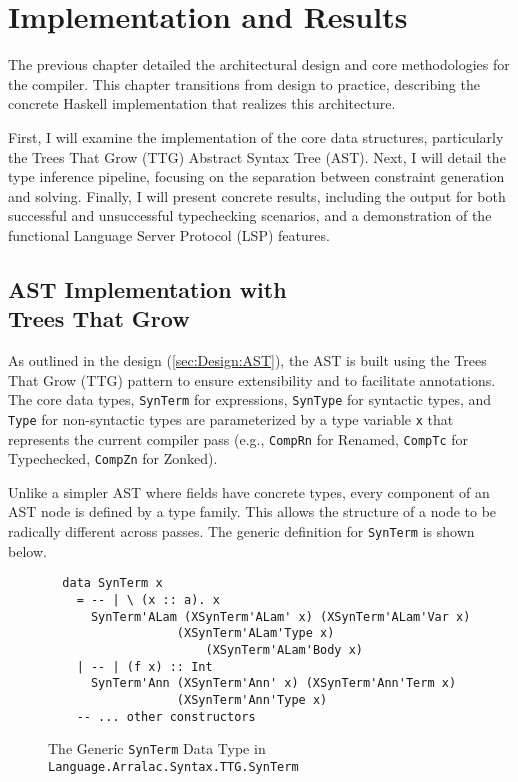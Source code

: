 \chapter{Implementation and Results}
\label{chap:ImplementationAndResults}

The previous chapter detailed the architectural design and core methodologies for the \Arralac compiler. This chapter transitions from design to practice, describing the concrete Haskell implementation that realizes this architecture.

First, I will examine the implementation of the core data structures, particularly the Trees That Grow (TTG) Abstract Syntax Tree (AST). Next, I will detail the type inference pipeline, focusing on the separation between constraint generation and solving. Finally, I will present concrete results, including the output for both successful and unsuccessful typechecking scenarios, and a demonstration of the functional Language Server Protocol (LSP) features.

\section[AST Implementation with Trees That Grow]{AST Implementation with \\ Trees That Grow}
\label{sec:Implementation:AST}

As outlined in the design (\cref{sec:Design:AST}), the AST is built using the Trees That Grow (TTG) pattern to ensure extensibility and to facilitate annotations. The core data types, \texttt{SynTerm} for expressions, \texttt{SynType} for syntactic types, and \texttt{Type} for non-syntactic types are parameterized by a type variable \texttt{x} that represents the current compiler pass (e.g., \texttt{CompRn} for Renamed, \texttt{CompTc} for Typechecked, \texttt{CompZn} for Zonked).

Unlike a simpler AST where fields have concrete types, every component of an \Arralac AST node is defined by a type family. This allows the structure of a node to be radically different across passes. The generic definition for \texttt{SynTerm} is shown below.

\begin{figure}
    \centering
    \begin{verbatim}
  data SynTerm x
    = -- | \ (x :: a). x
      SynTerm'ALam (XSynTerm'ALam' x) (XSynTerm'ALam'Var x) 
                  (XSynTerm'ALam'Type x) 
                      (XSynTerm'ALam'Body x)
    | -- | (f x) :: Int
      SynTerm'Ann (XSynTerm'Ann' x) (XSynTerm'Ann'Term x) 
                  (XSynTerm'Ann'Type x)
    -- ... other constructors
  \end{verbatim}
    \caption[The Generic \texttt{SynTerm} Data Type]{The Generic \texttt{SynTerm} Data Type in \\ \texttt{Language.Arralac.Syntax.TTG.SynTerm}}
\end{figure}


